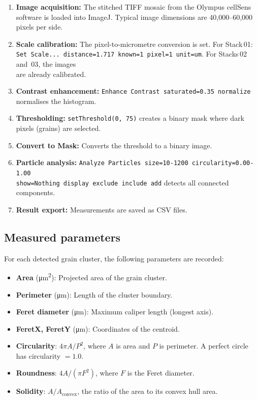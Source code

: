 \documentclass[12pt,a4paper]{article}
\begin{document}
\begin{enumerate}
  \item \textbf{Image acquisition:} The stitched TIFF mosaic from the
        Olympus cellSens software is loaded into ImageJ. Typical
        image dimensions are 40,000--60,000 pixels per side.
  \item \textbf{Scale calibration:} The pixel-to-micrometre conversion
        is set. For Stack\,01: \texttt{Set Scale... distance=1.717
        known=1 pixel=1 unit=um}. For Stacks\,02 and~03, the images \\
        are already calibrated.
  \item \textbf{Contrast enhancement:} \texttt{Enhance Contrast
        saturated=0.35 normalize} normalises the histogram.
  \item \textbf{Thresholding:} \texttt{setThreshold(0, 75)} creates
        a binary mask where dark pixels (grains) are selected.
  \item \textbf{Convert to Mask:} Converts the threshold to a binary
        image.
  \item \textbf{Particle analysis:} \texttt{Analyze Particles
        size=10-1200 circularity=0.00-1.00 \\ show=Nothing display
        exclude include add} detects all connected components.
  \item \textbf{Result export:} Measurements are saved as CSV files.
\end{enumerate}

\subsection{Measured parameters}

For each detected grain cluster, the following parameters are
recorded:

\begin{itemize}
  \item \textbf{Area} (\si{\micro\meter\squared}): Projected area of the
        grain cluster.
  \item \textbf{Perimeter} (\si{\micro\meter}): Length of the cluster
        boundary.
  \item \textbf{Feret diameter} (\si{\micro\meter}): Maximum caliper
        length (longest axis).
  \item \textbf{FeretX, FeretY} (\si{\micro\meter}): Coordinates of the
        centroid.
  \item \textbf{Circularity}: $4\pi A/P^2$, where $A$ is area and $P$
        is perimeter. A perfect circle has circularity $= 1.0$.
  \item \textbf{Roundness}: $4A/(\pi F^2)$, where $F$ is the Feret
        diameter.
  \item \textbf{Solidity}: $A / A_{\text{convex}}$, the ratio of the
        area to its convex hull area.
\end{itemize}
\end{document}
